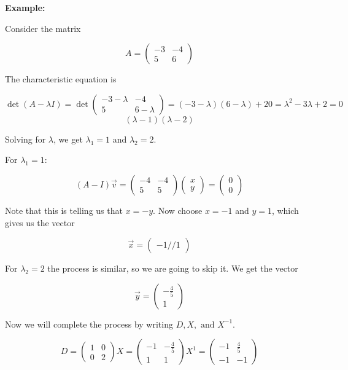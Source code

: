 \textbf{Example: }
\vspace{\baselineskip}

Consider the matrix

\[
    A = \begin{pmatrix}
    -3 & -4 \\
    5 & 6
    \end{pmatrix}
\]


The characteristic equation is

\[
    \det(A - \lambda I) 
    = \det 
    \begin{pmatrix}
            -3 - \lambda & -4 \\
        5 & 6 - \lambda
    \end{pmatrix} 
    = (-3 - \lambda)(6 - \lambda) + 20 = \lambda^2 - 3\lambda + 2 = 0    
\]
\[
    (\lambda - 1)(\lambda - 2)
\]

Solving for \(\lambda\), we get \(\lambda_1 = 1\) and \(\lambda_2 = 2\).
\vspace{\baselineskip}

For \(\lambda_1 = 1\):

\[
   (A - I)\vec{v} = \begin{pmatrix}
    -4 & -4 \\
    5 & 5
    \end{pmatrix} \begin{pmatrix}
    x \\
    y
    \end{pmatrix} = \begin{pmatrix}
    0 \\
    0
    \end{pmatrix}
\]

Note that this is telling us that \(x = -y\). Now choose \(x = -1\) and \(y = 1\), which gives us 
the vector 

\[
    \vec{x} = \begin{pmatrix}
        -1 // 1
    \end{pmatrix}
\]

For \(\lambda_2 = 2\) the process is similar, so we are going to skip it. We get the vector

\[
    \vec{y} = \begin{pmatrix}
        -\frac{4}{5} \\ 1
    \end{pmatrix}
\]

Now we will complete the process by writing \(D, X, \text{ and } X^{-1}\).

\[
    D = \begin{pmatrix}
        1 & 0 \\
        0 & 2
    \end{pmatrix}
    X = \begin{pmatrix}
        -1  & -\frac{4}{5} \\
        1   &   1 
    \end{pmatrix}
    X^{1} = \begin{pmatrix}
        -1  & \frac{4}{5} \\
        -1   &   -1 
    \end{pmatrix}
\]







